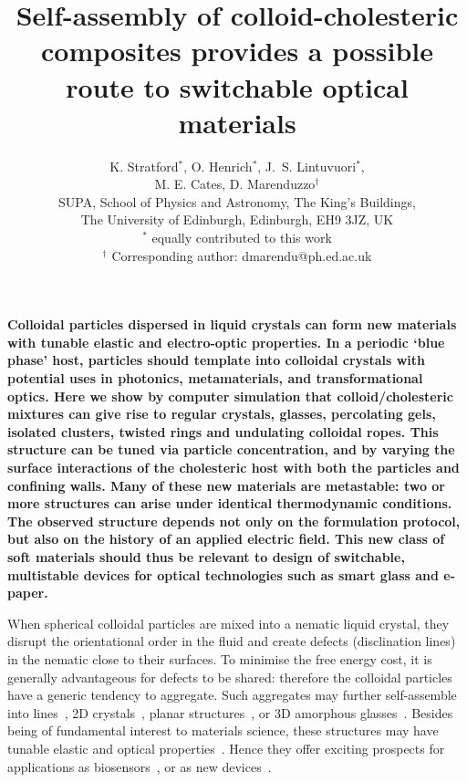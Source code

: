 \documentclass[12pt]{article}
\begin{document}
\title{Self-assembly of colloid-cholesteric composites provides
a possible route to switchable optical materials}

\author{K. Stratford$^{*}$, O. Henrich$^{*}$, J.~S. Lintuvuori$^{*}$,\\
M. E. Cates, D. Marenduzzo$^\dagger$ \\ 
SUPA, School of Physics and Astronomy, The King's Buildings,\\
The University of Edinburgh, Edinburgh, EH9 3JZ, UK\\
\small{$^{*}$ equally contributed to this work}\\
\small{$^\dagger$ Corresponding author: dmarendu@ph.ed.ac.uk}
}
\date{}

\maketitle

\noindent

\noindent
{\bf
Colloidal particles dispersed in liquid crystals can form new materials
with tunable elastic and electro-optic properties. In a periodic `blue
phase' host, particles should template into colloidal crystals with
potential uses in photonics, metamaterials, and transformational optics.
Here we show by computer simulation that colloid/cholesteric mixtures can
give rise to regular crystals, glasses, percolating gels, isolated clusters,
twisted rings and undulating colloidal ropes. This structure can be tuned
via particle concentration, and by varying the surface interactions of the
cholesteric host with both
the particles and confining walls. Many of these new materials are metastable:
two or more structures can arise under identical thermodynamic conditions.
The observed structure depends not only on the formulation protocol, but also
on the history of an applied electric field. This new class of soft materials
should thus be relevant to design of switchable, multistable devices for
optical technologies such as smart glass and e-paper.
}


\bigskip
\noindent

\noindent
When spherical colloidal particles are mixed into a nematic liquid crystal, 
they disrupt the orientational order in the fluid and create defects (disclination lines) in the nematic close to their surfaces. To minimise the free energy cost, it is generally advantageous for defects to be shared:
therefore the colloidal particles have a generic tendency to aggregate. Such aggregates may further 
self-assemble into lines~\cite{wiresmiha}, 2D crystals~\cite{zumer}, 
planar structures~\cite{tanaka}, or 3D amorphous glasses~\cite{tiffany}.
Besides being of fundamental interest to materials science, these
structures may have tunable elastic and optical properties~\cite{stark}. Hence 
they offer exciting prospects for applications as biosensors~\cite{abbott}, or
as new devices~\cite{colloiddevice,tanakanatmat}.
\end{document}
